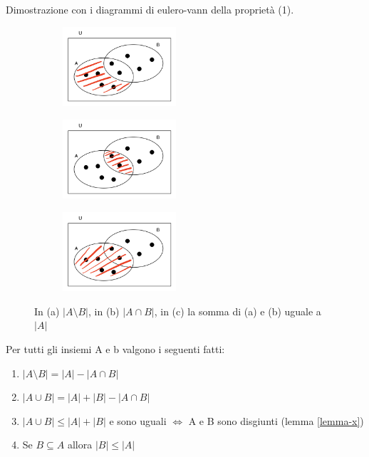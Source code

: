 \begin{demostration}
Dimostrazione con i diagrammi di eulero-vann della proprietà (1).
\end{demostration}
\begin{figure}[h!]
    \vspace{-5pt}
    \centering
    \begin{subfigure}{.3\textwidth}
        \centering
        \includegraphics[width=4.2cm]{images/dim-prop-cardinalita-1.png}
        \caption{}
    \end{subfigure}
    \hfill
    \begin{subfigure}{.3\textwidth}
        \centering
        \includegraphics[width=4.2cm]{images/dim-prop-cardinalita-2.png}
        \caption{}
    \end{subfigure}
    \hfill
    \begin{subfigure}{.3\textwidth}
        \centering
        \includegraphics[width=4.2cm]{images/dim-prop-cardinalita-3.png}
        \caption{}
    \end{subfigure}
    \caption{In (a) $|A\setminus B|$, in (b) $|A\cap B|$, in (c) la somma di (a) e (b) uguale a $|A|$}
\end{figure}

\begin{corollar}
Per tutti gli insiemi A e b valgono i seguenti fatti:
\begin{enumerate}
    \item $|A \setminus B| = |A| - |A\cap B|$
    \item $|A \cup B| = |A| + |B| - |A \cap B|$
    \item $|A \cup B| \leq |A| + |B|$ e sono uguali $\Longleftrightarrow$ A e B sono disgiunti (lemma \ref{lemma-x})
    \item Se $B \subseteq A$ allora $|B| \leq |A|$
\end{enumerate}
\end{corollar}

